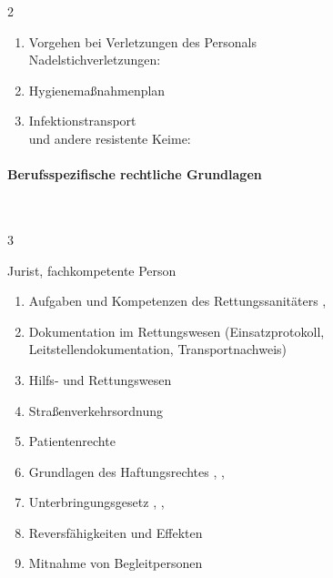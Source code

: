 \begin{WidePar}
\begin{multicols}{2}
\begin{enumerate}
    Übertragungswege:  \dotfill {},
    
    Kreuzinfektion:  \dotfill {}.
    \item
    Vorgehen bei Verletzungen des Personals
    \\
    Nadelstichverletzungen:  \dotfill {}
    \item    Hygienemaßnahmenplan \dotfill  {}
    \item    Infektionstransport
    \\
     und andere resistente Keime:  \dotfill {}
  \end{enumerate}

\paragraph{Berufsspezifische rechtliche Grundlagen}  ~
  
  \begin{inparadesc}
    \item[Stundenanzahl:] 3
    \item[Lehrkraft:]  Jurist, fachkompetente Person
  \end{inparadesc}
  
  \begin{enumerate}\item
    
    Aufgaben und Kompetenzen des  Rettungssanitäters \dotfill {},
    \item    Dokumentation im Rettungswesen (Einsatzprotokoll, Leitstellendokumentation, Transportnachweis) \dotfill {}
    \item    Hilfs- und Rettungswesen \dotfill  {}
    \item    Straßenverkehrsordnung \dotfill {}
    \item    Patientenrechte \dotfill {}
    \item    Grundlagen des Haftungsrechtes \dotfill  {},
    ,
    \item    Unterbringungsgesetz \dotfill {},
    ,
    \item    Reversfähigkeiten und Effekten \dotfill {}
    \item    Mitnahme von Begleitpersonen
    \\
  \end{enumerate}
  


\end{multicols}
\end{WidePar}
